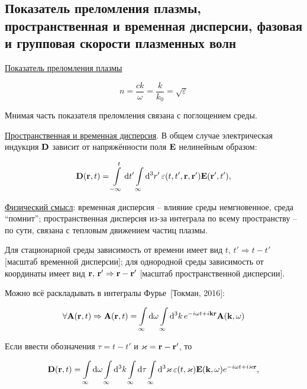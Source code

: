\documentclass[10pt, a4paper]{article}
\newcommand{\Tokman}{~[Токман, 2016]}
\begin{document}
\subsection{Показатель преломления плазмы, пространственная и временная дисперсии, фазовая и групповая скорости плазменных волн}
\label{subsec:refractive_index}

\uline{Показатель преломления плазмы}

\begin{equation*}
	n = \frac{ck}{\omega} = \frac{k}{k_0} = \sqrt{\varepsilon}
\end{equation*}

Мнимая часть показателя преломления связана с поглощением среды.

\uline{Пространственная и временная дисперсия}. В общем случае электрическая индукция $\vb{D}$ зависит от напряжённости поля $\vb{E}$ нелинейным образом:

\begin{equation*}
    \vb{D}(\vb{r}, t) = \int\limits_{-\infty}^{t}\dd{t'} \int\limits_{\infty}\dd[3]{r'}\varepsilon(t, t',\vb{r},\vb{r}') \vb{E}(\vb{r}', t'),
\end{equation*}

\uline{Физический смысл}: временная дисперсия -- влияние среды немгновенное, среда ``помнит''; пространственная дисперсия из-за интеграла по всему пространству -- по сути, связана с тепловым движением частиц плазмы.

Для стационарной среды зависимость от времени имеет вид $t,\,t'\Rightarrow t-t'$ [масштаб временной дисперсии]; для однородной среды зависимость от координаты имеет вид $\vb{r},\,\vb{r}'\Rightarrow \vb{r}-\vb{r}'$ [масштаб пространственной дисперсии].

Можно всё раскладывать в интегралы Фурье\Tokman:

\begin{equation*}
	\forall \vb{A}(\vb{r},t)\Rightarrow \vb{A}(\vb{r},t)=\int\limits_{\infty}\dd{\omega} \int\limits_{\infty}\dd[3]{k}e^{-i\omega t+i\vb{k}\vb{r}}\vb{A}(\vb{k},\omega)
\end{equation*}

Если ввести обозначения $\tau=t-t'$ и $\vb{\varkappa} = \vb{r}-\vb{r}'$, то

\begin{equation*}
	\vb{D}(\vb{r}, t) = \int\limits_{\infty} \dd{\omega} \int\limits_{\infty} \dd[3]{k} \int\limits_{\infty} \dd{\tau} \int\limits_{\infty} \dd[3]{\varkappa} \varepsilon(t, \vb{\varkappa}) \vb{E}(\vb{k}, \omega) e^{-i\omega t+ i\vb{\varkappa}\vb{r}},
\end{equation*}
\end{document}

